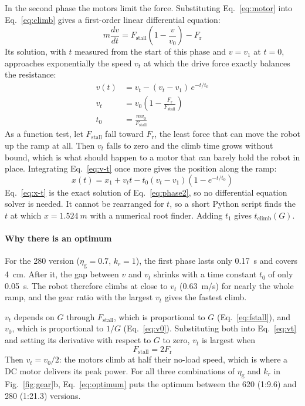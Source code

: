 In the second phase the motors limit the force. Substituting Eq.~\eqref{eq:motor} into Eq.~\eqref{eq:climb} gives a first-order linear differential equation:
\begin{equation}
  m \frac{dv}{dt} = F_\mathrm{stall}\left(1 - \frac{v}{v_0}\right) - F_\mathrm{r}
  \label{eq:phase2}
\end{equation}
Its solution, with $t$ measured from the start of this phase and $v = v_1$ at $t = 0$, approaches exponentially the speed $v_t$ at which the drive force exactly balances the resistance:
\begin{align}
  v(t) &= v_t - (v_t - v_1)\, e^{-t/t_0} \label{eq:v-t} \\
  v_t &= v_0\left(1 - \frac{F_\mathrm{r}}{F_\mathrm{stall}}\right) \label{eq:vt} \\
  t_0 &= \frac{m v_0}{F_\mathrm{stall}} \label{eq:t0}
\end{align}
As a function test, let $F_\mathrm{stall}$ fall toward $F_\mathrm{r}$, the least force that can move the robot up the ramp at all. Then $v_t$ falls to zero and the climb time grows without bound, which is what should happen to a motor that can barely hold the robot in place.
Integrating Eq.~\eqref{eq:v-t} once more gives the position along the ramp:
\begin{equation}
  x(t) = x_1 + v_t t - t_0 (v_t - v_1)\left(1 - e^{-t/t_0}\right)
  \label{eq:x-t}
\end{equation}
Eq.~\eqref{eq:x-t} is the exact solution of Eq.~\eqref{eq:phase2}, so no differential equation solver is needed. It cannot be rearranged for $t$, so a short Python script finds the $t$ at which $x = \qty{1.524}{m}$ with a numerical root finder. Adding $t_1$ gives $t_\mathrm{climb}(G)$.

\paragraph{Why there is an optimum}
For the \qty{280}{\rpm} version ($\eta_\mathrm{g} = 0.7$, $k_r = 1$), the first phase lasts only \qty{0.17}{s} and covers \qty{4}{cm}. After it, the gap between $v$ and $v_t$ shrinks with a time constant $t_0$ of only \qty{0.05}{s}. The robot therefore climbs at close to $v_t$ (\qty{0.63}{m/s}) for nearly the whole ramp, and the gear ratio with the largest $v_t$ gives the fastest climb.

$v_t$ depends on $G$ through $F_\mathrm{stall}$, which is proportional to $G$ (Eq.~\eqref{eq:fstall}), and $v_0$, which is proportional to $1/G$ (Eq.~\eqref{eq:v0}). Substituting both into Eq.~\eqref{eq:vt} and setting its derivative with respect to $G$ to zero, $v_t$ is largest when
\begin{equation}
  F_\mathrm{stall} = 2 F_\mathrm{r}
  \label{eq:optimum}
\end{equation}
Then $v_t = v_0/2$: the motors climb at half their no-load speed, which is where a DC motor delivers its peak power. For all three combinations of $\eta_\mathrm{g}$ and $k_r$ in Fig.~\ref{fig:gear}b, Eq.~\eqref{eq:optimum} puts the optimum between the \qty{620}{\rpm} (1:9.6) and \qty{280}{\rpm} (1:21.3) versions.

